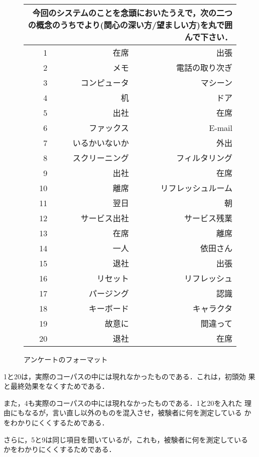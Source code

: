 \begin{figure*}[t]
\begin{center}
\begin{tabular}{|r|r|r|}
\multicolumn{3}{p{9.5cm}}{今回のシステムのことを念頭においたうえで，次の二つ
の概念のうちでより(関心の深い方/望ましい方)を丸で囲んで下さい．}\\	\hline
1 & 在席 & 出張\\	\hline
2 & メモ & 電話の取り次ぎ\\	\hline
3 & コンピュータ & マシーン\\	\hline
4 & 机 & ドア\\	\hline
5 & 出社 & 在席\\	\hline
6 & ファックス & E-mail\\	\hline
7 & いるかいないか & 外出 \\	\hline
8 & スクリーニング & フィルタリング\\	\hline
9 & 出社 & 在席 \\	\hline
10 & 離席 & リフレッシュルーム\\	\hline
11 & 翌日 & 朝\\	\hline
12 & サービス出社 & サービス残業\\	\hline
13 & 在席 & 離席\\	\hline
14 & 一人 & 依田さん\\	\hline
15 & 退社 & 出張\\	\hline
16 & リセット & リフレッシュ\\	\hline
17 & パージング & 認識 \\	\hline
18 & キーボード & キャラクタ\\	\hline
19 & 故意に & 間違って\\	\hline
20 & 退社 & 在席\\	\hline
\end{tabular}
\caption{アンケートのフォーマット}
\label{questionnaire3}
\end{center}
\end{figure*}

1と20は，実際のコーパスの中には現れなかったものである．これは，初頭効
果と最終効果をなくすためである．

また，4も実際のコーパスの中には現れなかったものである．1と20を入れた
理由にもなるが，言い直し以外のものを混入させ，被験者に何を測定している
かをわかりにくくするためである．

さらに，5と9は同じ項目を聞いているが，これも，被験者に何を測定している
かをわかりにくくするためである．

